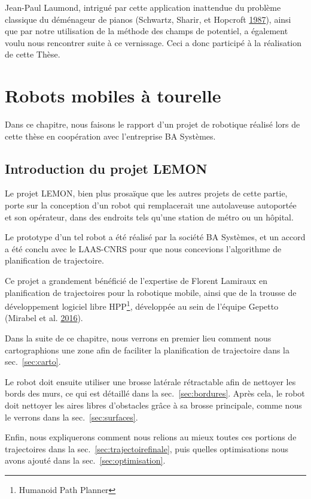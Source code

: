 \documentclass[french,A4paper,]{book}
\begin{document}
Jean-Paul Laumond, intrigué par cette application inattendue du problème
classique du déménageur de pianos (Schwartz, Sharir, et Hopcroft
\protect\hyperlink{ref-schwartz87}{1987}), ainsi que par notre
utilisation de la méthode des champs de potentiel, a également voulu
nous rencontrer suite à ce vernissage. Ceci a donc participé à la
réalisation de cette Thèse.

\chapter{Robots mobiles à tourelle}\label{sec:lemon}

Dans ce chapitre, nous faisons le rapport d'un projet de robotique
réalisé lors de cette thèse en coopération avec l'entreprise BA
Systèmes.

\section{Introduction du projet
LEMON}\label{introduction-du-projet-lemon}

Le projet LEMON, bien plus prosaïque que les autres projets de cette
partie, porte sur la conception d'un robot qui remplacerait une
autolaveuse autoportée et son opérateur, dans des endroits tels qu'une
station de métro ou un hôpital.

Le prototype d'un tel robot a été réalisé par la société BA Systèmes, et
un accord a été conclu avec le LAAS-CNRS pour que nous concevions
l'algorithme de planification de trajectoire.

Ce projet a grandement bénéficié de l'expertise de Florent Lamiraux en
planification de trajectoires pour la robotique mobile, ainsi que de la
trousse de développement logiciel libre HPP\footnote{Humanoid Path
  Planner}, développée au sein de l'équipe Gepetto (Mirabel et al.
\protect\hyperlink{ref-hpp}{2016}).

Dans la suite de ce chapitre, nous verrons en premier lieu comment nous
cartographions une zone afin de faciliter la planification de
trajectoire dans la sec.~\ref{sec:carto}.

Le robot doit ensuite utiliser une brosse latérale rétractable afin de
nettoyer les bords des murs, ce qui est détaillé dans la
sec.~\ref{sec:bordures}. Après cela, le robot doit nettoyer les aires
libres d'obstacles grâce à sa brosse principale, comme nous le verrons
dans la sec.~\ref{sec:surfaces}.

Enfin, nous expliquerons comment nous relions au mieux toutes ces
portions de trajectoires dans la sec.~\ref{sec:trajectoirefinale}, puis
quelles optimisations nous avons ajouté dans la
sec.~\ref{sec:optimisation}.
\end{document}
